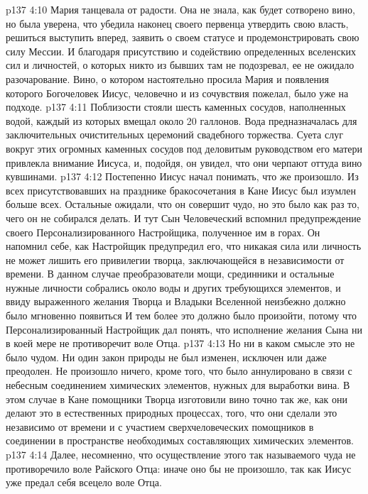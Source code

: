 \vs p137 4:10 Мария танцевала от радости. Она не знала, как будет сотворено вино, но была уверена, что убедила наконец своего первенца утвердить свою власть, решиться выступить вперед, заявить о своем статусе и продемонстрировать свою силу Мессии. И благодаря присутствию и содействию определенных вселенских сил и личностей, о которых никто из бывших там не подозревал, ее не ожидало разочарование. Вино, о котором настоятельно просила Мария и появления которого Богочеловек Иисус, человечно и из сочувствия пожелал, было уже на подходе.
\vs p137 4:11 Поблизости стояли шесть каменных сосудов, наполненных водой, каждый из которых вмещал около 20 галлонов. Вода предназначалась для заключительных очистительных церемоний свадебного торжества. Суета слуг вокруг этих огромных каменных сосудов под деловитым руководством его матери привлекла внимание Иисуса, и, подойдя, он увидел, что они черпают оттуда вино кувшинами.
\vs p137 4:12 Постепенно Иисус начал понимать, что же произошло. Из всех присутствовавших на празднике бракосочетания в Кане Иисус был изумлен больше всех. Остальные ожидали, что он совершит чудо, но это было как раз то, чего он не собирался делать. И тут Сын Человеческий вспомнил предупреждение своего Персонализированного Настройщика, полученное им в горах. Он напомнил себе, как Настройщик предупредил его, что никакая сила или личность не может лишить его привилегии творца, заключающейся в независимости от времени. В данном случае преобразователи мощи, срединники и остальные нужные личности собрались около воды и других требующихся элементов, и ввиду выраженного желания Творца и Владыки Вселенной неизбежно должно было мгновенно появиться  И тем более это должно было произойти, потому что Персонализированный Настройщик дал понять, что исполнение желания Сына ни в коей мере не противоречит воле Отца.
\vs p137 4:13 Но ни в каком смысле это не было чудом. Ни один закон природы не был изменен, исключен или даже преодолен. Не произошло ничего, кроме того, что было аннулировано  в связи с небесным соединением химических элементов, нужных для выработки вина. В этом случае в Кане помощники Творца изготовили вино точно так же, как они делают это в естественных природных процессах,  того, что они сделали это независимо от времени и с участием сверхчеловеческих помощников в соединении в пространстве необходимых составляющих химических элементов.
\vs p137 4:14 Далее, несомненно, что осуществление этого так называемого чуда не противоречило воле Райского Отца: иначе оно бы не произошло, так как Иисус уже предал себя всецело воле Отца.
